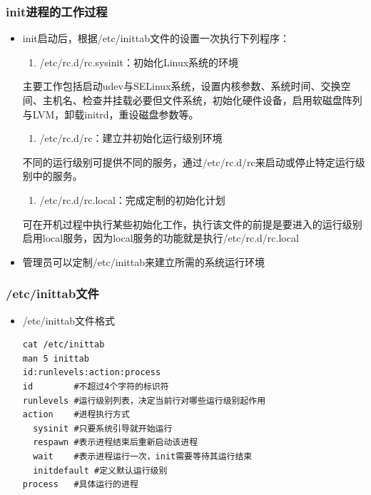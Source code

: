 \documentclass[xcolor=svgnames,presentation]{beamer}
\begin{document}
\begin{frame}
\frametitle{init进程的工作过程}
\label{sec-1-6}
\begin{itemize}

\item init启动后，根据/etc/inittab文件的设置一次执行下列程序：
\label{sec-1-6-1}%
\begin{enumerate}
\item /etc/rc.d/rc.sysinit：初始化Linux系统的环境
\end{enumerate}
主要工作包括启动udev与SELinux系统，设置内核参数、系统时间、交换空间、主机名、检查并挂载必要但文件系统，初始化硬件设备，启用软磁盘阵列与LVM，卸载initrd，重设磁盘参数等。
\begin{enumerate}
\item /etc/rc.d/rc：建立并初始化运行级别环境
\end{enumerate}
不同的运行级别可提供不同的服务，通过/etc/rc.d/rc来启动或停止特定运行级别中的服务。
\begin{enumerate}
\item /etc/rc.d/rc.local：完成定制的初始化计划
\end{enumerate}
可在开机过程中执行某些初始化工作，执行该文件的前提是要进入的运行级别启用local服务，因为local服务的功能就是执行/etc/rc.d/rc.local

\item 管理员可以定制/etc/inittab来建立所需的系统运行环境
\label{sec-1-6-2}%
\end{itemize} %
\end{frame}
\begin{frame}[fragile]
\frametitle{/etc/inittab文件}
\label{sec-1-7}
\begin{itemize}

\item /etc/inittab文件格式\\
\label{sec-1-7-1}%
\begin{verbatim}
cat /etc/inittab
man 5 inittab
id:runlevels:action:process
id        #不超过4个字符的标识符
runlevels #运行级别列表，决定当前行对哪些运行级别起作用
action    #进程执行方式
  sysinit #只要系统引导就开始运行
  respawn #表示进程结束后重新启动该进程
  wait    #表示进程运行一次，init需要等待其运行结束
  initdefault #定义默认运行级别
process   #具体运行的进程
\end{verbatim}
\end{itemize} %
\end{frame}
\end{document}
